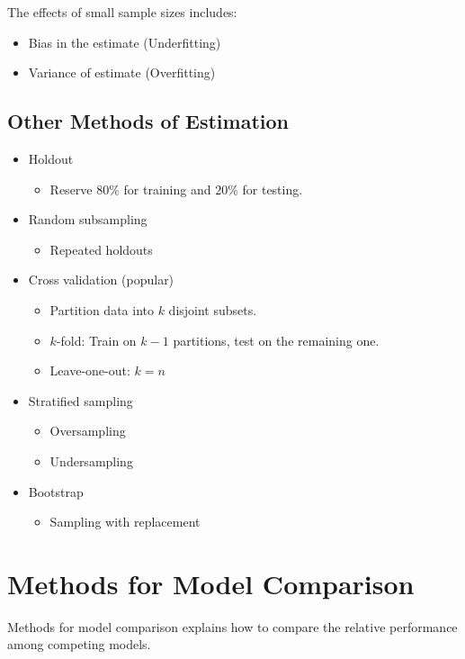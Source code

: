 The effects of small sample sizes includes:
\begin{itemize}
    \item Bias in the estimate (Underfitting)
    \item Variance of estimate (Overfitting)
\end{itemize}

\subsection{Other Methods of Estimation}
\begin{itemize}
    \item Holdout
    \begin{itemize}
        \item Reserve $80\%$ for training and $20\%$ for testing.
    \end{itemize}
    \item Random subsampling
    \begin{itemize}
        \item Repeated holdouts
    \end{itemize}
    \item Cross validation (popular)
    \begin{itemize}
        \item Partition data into $k$ disjoint subsets.
        \item $k$-fold: Train on $k-1$ partitions, test on the remaining one.
        \item Leave-one-out: $k=n$
    \end{itemize}
    \item Stratified sampling
    \begin{itemize}
        \item Oversampling
        \item Undersampling
    \end{itemize}
    \item Bootstrap
    \begin{itemize}
        \item Sampling with replacement
    \end{itemize}
\end{itemize}

\newpage
\section{Methods for Model Comparison}
Methods for model comparison explains how to compare the relative performance among competing models.

